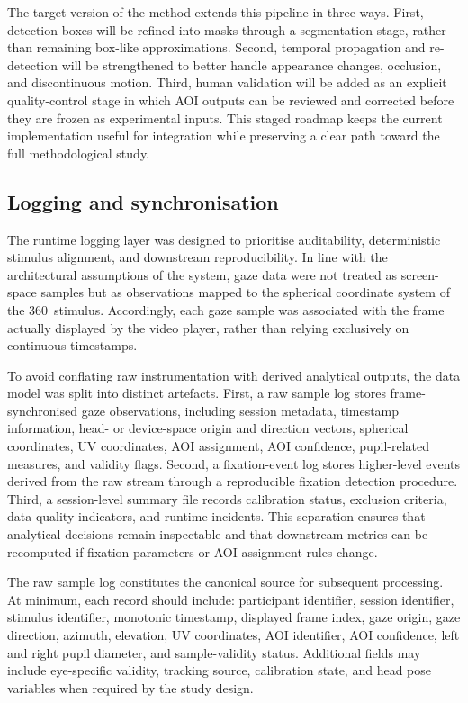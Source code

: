 \documentclass[11pt]{article}
\begin{document}
The target version of the method extends this pipeline in three ways. First, detection boxes will be refined into masks through a segmentation stage, rather than remaining box-like approximations. Second, temporal propagation and re-detection will be strengthened to better handle appearance changes, occlusion, and discontinuous motion. Third, human validation will be added as an explicit quality-control stage in which AOI outputs can be reviewed and corrected before they are frozen as experimental inputs. This staged roadmap keeps the current implementation useful for integration while preserving a clear path toward the full methodological study.


\subsection{Logging and synchronisation}

The runtime logging layer was designed to prioritise auditability, deterministic stimulus alignment, and downstream reproducibility. In line with the architectural assumptions of the system, gaze data were not treated as screen-space samples but as observations mapped to the spherical coordinate system of the 360\textdegree\ stimulus. Accordingly, each gaze sample was associated with the frame actually displayed by the video player, rather than relying exclusively on continuous timestamps.

To avoid conflating raw instrumentation with derived analytical outputs, the data model was split into distinct artefacts. First, a raw sample log stores frame-synchronised gaze observations, including session metadata, timestamp information, head- or device-space origin and direction vectors, spherical coordinates, UV coordinates, AOI assignment, AOI confidence, pupil-related measures, and validity flags. Second, a fixation-event log stores higher-level events derived from the raw stream through a reproducible fixation detection procedure. Third, a session-level summary file records calibration status, exclusion criteria, data-quality indicators, and runtime incidents. This separation ensures that analytical decisions remain inspectable and that downstream metrics can be recomputed if fixation parameters or AOI assignment rules change.

The raw sample log constitutes the canonical source for subsequent processing. At minimum, each record should include: participant identifier, session identifier, stimulus identifier, monotonic timestamp, displayed frame index, gaze origin, gaze direction, azimuth, elevation, UV coordinates, AOI identifier, AOI confidence, left and right pupil diameter, and sample-validity status. Additional fields may include eye-specific validity, tracking source, calibration state, and head pose variables when required by the study design.
\end{document}
